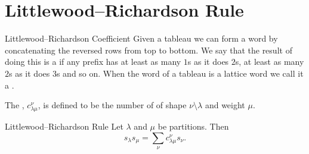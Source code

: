 \documentclass[fleqn]{NotesClass}
\begin{document}
    \section{Littlewood--Richardson Rule}
    \begin{dfn}{Littlewood--Richardson Coefficient}{}
        Given a tableau we can form a word by concatenating the reversed rows from top to bottom.
        We say that the result of doing this is a  if any prefix has at least as many \(1\)s as it does \(2\)s, at least as many \(2\)s as it does \(3\)s and so on.
        When the word of a tableau is a lattice word we call it a .
        
        The , \(c_{\lambda\mu}^\nu\), is defined to be the number of of shape \(\nu \setminus \lambda\) and weight \(\mu\).
    \end{dfn}
    
    \begin{thm}{Littlewood--Richardson Rule}{}
        Let \(\lambda\) and \(\mu\) be partitions.
        Then
        \begin{equation}
            s_\lambda s_\mu = \sum_{\nu} c^\nu_{\lambda\mu} s_\nu.
        \end{equation}
    \end{thm}
    
	\appendixpage
	\begin{appendices}
	    
	\end{appendices}

    \backmatter
    \renewcommand{\glossaryname}{Acronyms}
    \printglossary[acronym]
    \printindex
\end{document}
